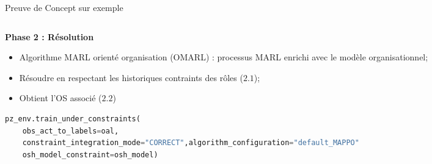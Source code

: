     
    \begin{frame}[fragile]{Preuve de Concept sur exemple}{}
    
    \begin{columns}
    
        \begin{column}{0.6\textwidth}
    
            \textbf{Phase 2 : Résolution}
    
            \begin{itemize}
                \item Algorithme MARL orienté organisation (OMARL) : processus MARL enrichi avec le modèle organisationnel;
                \item Résoudre en respectant les historiques contraints des rôles ($2.1$);
                \item Obtient l'OS associé ($2.2$)
            \end{itemize}

            \begin{lstlisting}[language=Python,basicstyle=\scriptsize]
pz_env.train_under_constraints(
    obs_act_to_labels=oal,
    constraint_integration_mode="CORRECT",algorithm_configuration="default_MAPPO"
    osh_model_constraint=osh_model)
            \end{lstlisting}

        \end{column}
    

\end{columns}
\end{frame}
